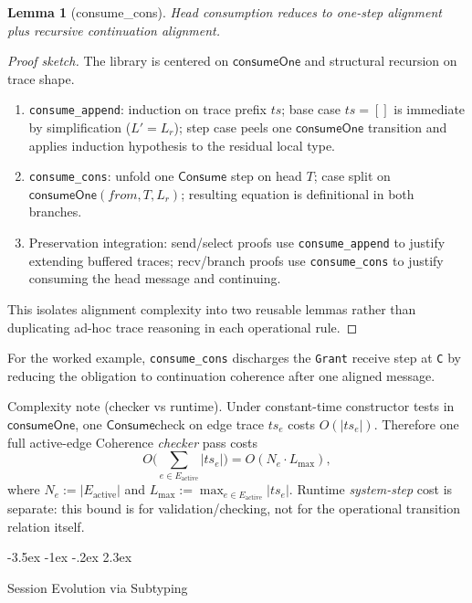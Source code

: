 \documentclass[a4paper,10pt,twocolumn,english]{article}
\makeatletter
\renewcommand{\section}{\@startsection{section}{1}{\z@}%
  {-3.5ex \@plus -1ex \@minus -.2ex}%
  {2.3ex}%
  {\raggedright\normalfont\large\bfseries}}
\numberwithin{equation}{section}
\theoremstyle{paperdef}
\theoremstyle{paperplain}
\newtheorem{lemma}[definition]{Lemma}
\theoremstyle{paperdef}
\theoremstyle{paperremark}
\newcommand{\Consume}{\ensuremath{\mathsf{Consume}}}
\newcommand{\consumeOne}{\ensuremath{\mathsf{consumeOne}}}
\makeatother
\begin{document}
\begin{lemma}[consume\_cons]
	Head consumption reduces to one-step alignment plus recursive continuation alignment.
\end{lemma}

\begin{proof}[Proof sketch]
	The library is centered on $\consumeOne$ and structural recursion on trace shape.

	\begin{enumerate}
		\item \nolinkurl{consume_append}: induction on trace prefix $ts$; base case $ts = []$ is immediate by simplification ($L' = L_r$); step case peels one $\consumeOne$ transition and applies induction hypothesis to the residual local type.
		\item \nolinkurl{consume_cons}: unfold one $\Consume$ step on head $T$; case split on $\consumeOne(\mathit{from}, T, L_r)$; resulting equation is definitional in both branches.
		\item Preservation integration: send/select proofs use \nolinkurl{consume_append} to justify extending buffered traces; recv/branch proofs use \nolinkurl{consume_cons} to justify consuming the head message and continuing.
	\end{enumerate}

	This isolates alignment complexity into two reusable lemmas rather than duplicating ad-hoc trace reasoning in each operational rule.
\end{proof}

For the worked example, \nolinkurl{consume_cons} discharges the \texttt{Grant} receive step at \texttt{C} by reducing the obligation to continuation coherence after one aligned message.

Complexity note (checker vs runtime). Under constant-time constructor tests in
\consumeOne, one \Consume check on edge trace $ts_e$ costs $O(|ts_e|)$.
Therefore one full active-edge Coherence \emph{checker} pass costs
\[
	O\!\Big(\sum_{e\in E_{\mathrm{active}}}|ts_e|\Big)=O(N_e\cdot L_{\max}),
\]
where $N_e:=|E_{\mathrm{active}}|$ and
$L_{\max}:=\max_{e\in E_{\mathrm{active}}}|ts_e|$. Runtime \emph{system-step}
cost is separate: this bound is for validation/checking, not for the
operational transition relation itself.

\section{Session Evolution via Subtyping}
\label{sec:evolution}
\end{document}
